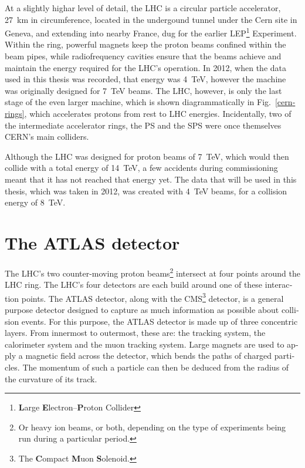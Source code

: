 \begin{english}
At a slightly highar level of detail, the LHC is a circular particle accelerator, 27~km in circumference, located in the undergound tunnel under the Cern site in Geneva, and extending into nearby France, dug for the earlier LEP\footnote{\textbf{L}arge \textbf{E}lectron--\textbf{P}roton Collider} Experiment. Within the ring, powerful magnets keep the proton beams confined within the beam pipes, while radiofrequency cavities ensure that the beams achieve and maintain the energy required for the LHC's operation. In 2012, when the data used in this thesis was recorded, that energy was 4~TeV, however the machine was originally designed for 7~TeV beams. The LHC, however, is only the last stage of the even larger machine, which is shown diagrammatically in Fig.~\ref{cernrings}, which accelerates protons from rest to LHC energies. Incidentally, two of the intermediate accelerator rings, the PS and the SPS were once themselves CERN's main colliders.

Although the LHC was designed for proton beams of 7~TeV, which would then collide with a total energy of 14~TeV, a few accidents during commissioning meant that it has not reached that energy yet. The data that will be used in this thesis, which was taken in 2012, was created with 4~TeV beams, for a collision energy of 8~TeV.

\section{The ATLAS detector}
The LHC's two counter-moving proton beams\footnote{Or heavy ion beams, or both, depending on the type of experiments being run during a particular period.} intersect at four points around the LHC ring. The LHC's four detectors are each build around one of these interaction points. The ATLAS detector, along with the CMS\footnote{The \textbf{C}ompact \textbf{M}uon \textbf{S}olenoid.} detector, is a general purpose detector designed to capture as much information as possible about collision events. For this purpose, the ATLAS detector is made up of three concentric layers. From innermost to outermost, these are: the tracking system, the calorimeter system and the muon tracking system. Large magnets are used to apply a magnetic field across the detector, which bends the paths of charged particles. The momentum of such a particle can then be deduced from the radius of the curvature of its track.


\end{english}
